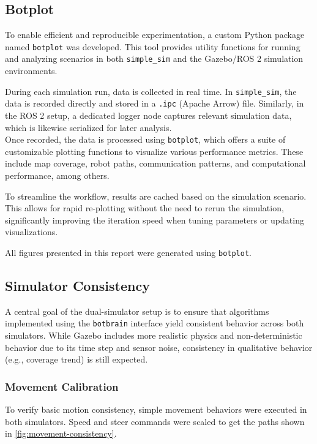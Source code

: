 \subsection{Botplot}
To enable efficient and reproducible experimentation, a custom Python package named \texttt{botplot} was developed. This tool provides utility functions for running and analyzing scenarios in both \texttt{simple\_sim} and the Gazebo/ROS 2 simulation environments.

During each simulation run, data is collected in real time. In \texttt{simple\_sim}, the data is recorded directly and stored in a \texttt{.ipc} (Apache Arrow) file. Similarly, in the ROS 2 setup, a dedicated logger node captures relevant simulation data, which is likewise serialized for later analysis.\\

Once recorded, the data is processed using \texttt{botplot}, which offers a suite of customizable plotting functions to visualize various performance metrics. These include map coverage, robot paths, communication patterns, and computational performance, among others.

To streamline the workflow, results are cached based on the simulation scenario. This allows for rapid re-plotting without the need to rerun the simulation, significantly improving the iteration speed when tuning parameters or updating visualizations.

All figures presented in this report were generated using \texttt{botplot}.

\subsection{Simulator Consistency}
\label{sec:simulator-consistency}
A central goal of the dual-simulator setup is to ensure that algorithms implemented using the \texttt{botbrain} interface yield consistent behavior across both simulators. While Gazebo includes more realistic physics and non-deterministic behavior due to its time step and sensor noise, consistency in qualitative behavior (e.g., coverage trend) is still expected.

\subsubsection{Movement Calibration}
To verify basic motion consistency, simple movement behaviors were executed in both simulators. Speed and steer commands were scaled to get the paths shown in \cref{fig:movement-consistency}. 

